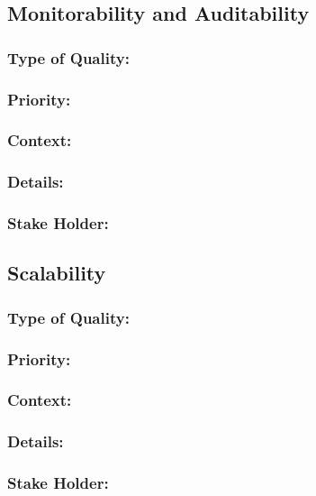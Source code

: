 \documentclass[11pt]{article}
\begin{document}
	\subsection{Monitorability and Auditability}
		\subsubsection{Type of Quality:}
			\textbf{}
		
		\subsubsection{Priority:}
			\textbf{}

		\subsubsection{Context:}
			\textbf{}
		
		\subsubsection{Details:}
			\textbf{}
		
		\subsubsection{Stake Holder:}
			\textbf{}
	
	\subsection{Scalability}	
		\subsubsection{Type of Quality:}
			\textbf{}
		
		\subsubsection{Priority:}
			\textbf{}

		\subsubsection{Context:}
			\textbf{}
		
		\subsubsection{Details:}
			\textbf{}
		
		\subsubsection{Stake Holder:}
			\textbf{}
	
\end{document}

